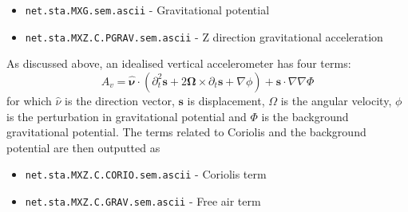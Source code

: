  \begin{itemize}
     \item \texttt{net.sta.MXG.sem.ascii} - Gravitational potential 
     \item \texttt{net.sta.MXZ.C.PGRAV.sem.ascii} - Z direction gravitational acceleration 
 \end{itemize} 
 
 As discussed above, an idealised vertical accelerometer has four terms: 
 \begin{equation}
     A_v = \mathbf{\hat{\nu}} \cdot \left( \partial_t^2 \mathbf{s} + 2\mathbf{\Omega} \times \partial_t\mathbf{s}  + \nabla\phi \right) + \mathbf{s}\cdot \nabla\nabla\Phi \label{eq:idealised_accelerometer}
 \end{equation}
 for which $\hat{\nu}$ is the direction vector, $\mathbf{s}$ is displacement, ${\Omega}$ is the angular velocity, $\phi$ is the 
 perturbation in gravitational potential and $\Phi$ is the background gravitational potential. The terms related to Coriolis
 and the background potential are then outputted as 
 
 \begin{itemize}
     \item \texttt{net.sta.MXZ.C.CORIO.sem.ascii} - Coriolis term 
     \item \texttt{net.sta.MXZ.C.GRAV.sem.ascii}  - Free air term
 \end{itemize} 